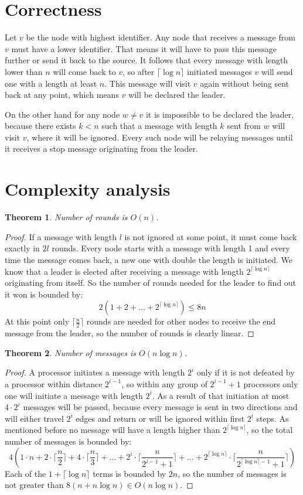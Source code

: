 \documentclass[a4paper,12pt]{article}
\newtheorem{theorem}{Theorem}
\begin{document}
\section{Correctness}
Let $v$ be the node with highest identifier. Any node that receives a message from $v$ must have a lower identifier. That means it will have to pass this message further or send it back to the source. It follows that every message with length lower than $n$ will come back to $v$, so after $\lceil\log n\rceil$ initiated messages $v$ will send one with a length at least $n$. This message will visit $v$ again without being sent back at any point, which means $v$ will be declared the leader.\par
On the other hand for any node $w\neq v$ it is impossible to be declared the leader, because there exists $k<n$ such that a message with length $k$ sent from $w$ will visit $v$, where it will be ignored. Every such node will be relaying messages until it receives a stop message originating from the leader.

\section{Complexity analysis}
\begin{theorem}
Number of rounds is $O(n)$.
\end{theorem}
\begin{proof}
If a message with length $l$ is not ignored at some point, it must come back exactly in $2l$ rounds. Every node starts with a message with length 1 and every time the message comes back, a new one with double the length is initiated. We know that a leader is elected after receiving a message with length $2^{\lceil\log n\rceil}$ originating from itself. So the number of rounds needed for the leader to find out it won is bounded by:
$$2(1+2+\dots+2^{\lceil\log n\rceil})\leqslant 8n$$
At this point only $\lceil\frac{n}{2}\rceil$ rounds are needed for other nodes to receive the end message from the leader, so the number of rounds is clearly linear.
\end{proof}

\begin{theorem}
Number of messages is $O(n\log n)$.
\end{theorem}
\begin{proof}
A processor initiates a message with length $2^i$ only if it is not defeated by a processor within distance $2^{i-1}$, so within any group of $2^{i-1}+1$ processors only one will initiate a message with length $2^i$. As a result of that initiation at most $4\cdot2^i$ messages will be passed, because every message is sent in two directions and will either travel $2^i$ edges and return or will be ignored within first $2^i$ steps. As mentioned before no message will have a length higher than $2^{\lceil\log n\rceil}$, so the total number of messages is bounded by:
$$4(1\cdot n +2\cdot\lceil\frac{n}{2}\rceil+4\cdot\lceil\frac{n}{3}\rceil+\dots+2^i\cdot\lceil\frac{n}{2^{i-1}+1}\rceil+\dots+2^{\lceil\log n\rceil}\cdot\lceil\frac{n}{2^{\lceil\log n\rceil-1}+1}\rceil)$$
Each of the $1+\lceil\log n\rceil$ terms is bounded by $2n$, so the number of messages is not greater than $8(n+n\log n)\in O(n\log n)$.
\end{proof}

\printbibliography
\end{document}
